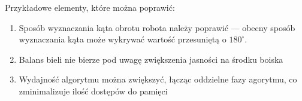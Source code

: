 \documentclass[polish,12pt]{aghthesis}
\begin{document}
Przykładowe elementy, które można poprawić:
\begin{enumerate}
\item Sposób wyznaczania kąta obrotu robota należy poprawić --- obecny
sposób wyznaczania kąta może wykrywać wartość przesuniętą o $180^\circ$.
\item Balans bieli nie bierze pod uwagę zwiększenia jasności na środku boiska
\item Wydajność algorytmu można zwiększyć, łącząc oddzielne fazy agorytmu,  
co zminimalizuje ilość dostępów do pamięci
\end{enumerate}





\end{document}
